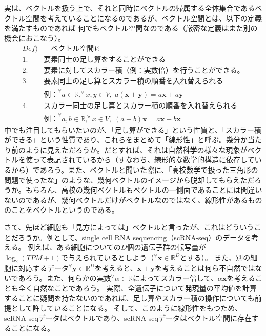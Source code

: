 \documentclass[10pt]{ujarticle}
\begin{document}
実は、ベクトルを扱う上で、それと同時にベクトルの帰属する全体集合であるベクトル空間を考えていることになるのであるが、ベクトル空間とは、以下の定義を満たすものであれば
何でもベクトル空間なのである（厳密な定義はまた別の機会におこなう）。
$$
\begin{aligned}
  Def)&\quad\text{ベクトル空間} V:\\
  1.& \text{要素同士の足し算をすることができる}\\
  2.& \text{要素に対してスカラー積（例：実数倍）を行うことができる。}\\
  3.& \text{要素同士の足し算とスカラー積の順番を入れ替えられる}\\
  &\text{例：}^\forall a\in\mathbb{R},^\forall x,y\in V,\; a(\mathbf{x+y})=a\mathbf{x}+a\mathbf{y}\\
  4.& \text{スカラー同士の足し算とスカラー積の順番を入れ替えられる}\\
  &\text{例：}^\forall a,b\in\mathbb{R},^\forall x\in V,\; (a+b)\mathbf{x}=a\mathbf{x}+b\mathbf{x}
\end{aligned}
$$
中でも注目してもらいたいのが、「足し算ができる」という性質と、「スカラー積ができる」という性質であり、これらをまとめて「線形性」と呼ぶ。幾分か当たり前のように見えただろうか。だとすれば、それは自然科学の様々な現象がベクトルを使って表記されているから（すなわち、線形的な数学的構造に依存しているから）であろう。また、ベクトルと聞いた際に、「高校数学で扱った三角形の問題で使ったな」のような、幾何ベクトルのイメージから脱却してもらえただろうか。もちろん、高校の幾何ベクトルもベクトルの一側面であることには間違いないのであるが、幾何ベクトルだけがベクトルなのではなく、線形性があるもののことをベクトルというのである。

さて、先ほど細胞も「見方によっては」ベクトルと言ったが、これはどういうことだろうか。例として、single cell RNA sequencing（scRNA-seq）のデータを考える。
例えば、ある細胞についての$D$個の遺伝子群の転写量が$\log_2(TPM+1)$で与えられているとしよう（$^\forall\mathbf{x}\in\mathbb{R}^D$とする）。
また、別の細胞に対応するデータ$^\forall\mathbf{y}\in\mathbb{R}^D$を考えると、$\mathbf{x+y}$を考えることは何ら不自然ではないであろう。また、何らかの実数$^\forall\alpha\in\mathbb{R}$によってスカラー倍して、$\alpha\mathbf{x}$を考えることも全く自然なことであろう。
実際、全遺伝子について発現量の平均値を計算することに疑問を持たないのであれば、足し算やスカラー積の操作についても前提として許していることになる。
そして、このように線形性をもつため、scRNA-seqデータはベクトルであり、scRNA-seqデータはベクトル空間に存在することになる。
\end{document}

